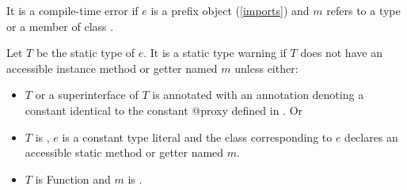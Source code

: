 \documentclass{article}
\newcommand{\code}[1]{{\sf #1}}
\begin{document}
  
 


\LMHash{}
It is a compile-time error if $e$ is a prefix object (\ref{imports}) and $m$ refers to a type or a member of class .


\LMHash{}
Let $T$ be the static type of $e$. It is a static type warning if $T$ does not have an accessible instance method or getter named $m$ unless either:
\begin{itemize}
\item $T$ or a superinterface of $T$ is annotated with an annotation denoting a constant identical to the constant \code{@proxy} defined in . Or
\item $T$ is , $e$ is a constant type literal and the class corresponding to $e$ declares an accessible static method or getter named $m$.
\item $T$ is \code{Function} and $m$ is \CALL.
\end{itemize}
\end{document}
